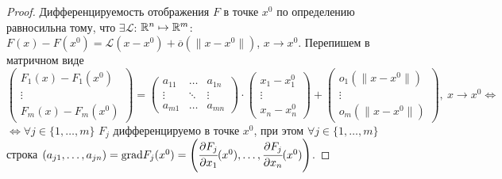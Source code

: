 \begin{proof}
    Дифференцируемость отображения $F$ в точке $x^{0}$ по определению равносильна тому, что $\exists \mathcal{L}$: $\mathbb{R}^n \mapsto \mathbb{R}^m$: $F(x) - F(x^{0}) = \mathcal{L}(x - x^{0}) + \overline{o}(\|x - x^{0}\|)$, $x\to x^{0}$. Перепишем в матричном виде 
    $$\begin{pmatrix}
            F_{1} (x) - F_{1} (x^{0})\\
            \vdots\\
            F_{m} (x) - F_{m} (x^{0})
        \end{pmatrix} = 
        \begin{pmatrix}
            a_{11}& \ldots & a_{1n}\\
            \vdots & \ddots & \vdots \\
            a_{m1}& \ldots & a_{mn}
        \end{pmatrix} \cdot \begin{pmatrix}
            x_{1} - x_{1}^{0}\\
            \vdots\\
            x_{n} - x_{n}^{0}
    \end{pmatrix} + \begin{pmatrix}
            o_{1} (\|x - x^{0}\|)\\
            \vdots\\
            o_{m} (\|x - x^{0}\|)
    \end{pmatrix}, \ x\to x^{0} \Longleftrightarrow$$
    $\Longleftrightarrow \forall j \in \{1, \ldots, m\}$ $F_{j}$ дифференцируемо в точке $x^{0}$, при этом $\forall j \in \{1, \ldots, m\}$ строка $(a_{j1}, \ldots, a_{jn}) = \text{grad}F_{j} (x^{0}) = \left(\cfrac{\partial F_{j}}{\partial x_{1}} (x^{0}), \ldots, \cfrac{\partial F_{j}}{\partial x_{n}} (x^{0})\right)$.
\end{proof}

